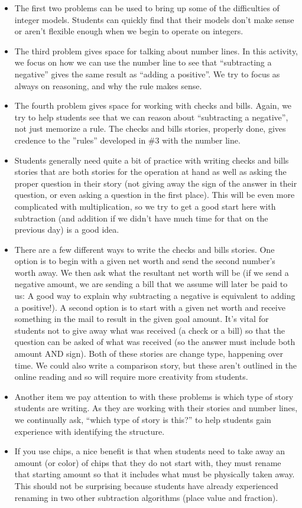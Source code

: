 \documentclass{ximera}
\begin{document}
\begin{instructorNotes}
\begin{itemize}
    \item The first two problems can be used to bring up some of the difficulties of integer models.  Students can quickly find that their models don't make sense or aren't flexible enough when we begin to operate on integers.
    \item The third problem gives space for talking about number lines.  In this activity, we focus on how we can use the number line to see that ``subtracting a negative'' gives the same result as ``adding a positive''.  We try to focus as always on reasoning, and why the rule makes sense.
    \item The fourth problem gives space for working with checks and bills.  Again, we try to help students see that we can reason about ``subtracting a negative'', not just memorize a rule.  The checks and bills stories, properly done, gives credence to the ''rules'' developed in \#3 with the number line. 
    \item Students generally need quite a bit of practice with writing checks and bills stories that are both stories for the operation at hand as well as asking the proper question in their story (not giving away the sign of the answer in their question, or even asking a question in the first place).  This will be even more complicated with multiplication, so we try to get a good start here with subtraction (and addition if we didn't have much time for that on the previous day) is a good idea.
    \item There are a few different ways to write the checks and bills stories. One option is to begin with a given net worth and send the second number's worth away.  We then ask what the resultant net worth will be (if we send a negative amount, we are sending a bill that we assume will later be paid to us:  A good way to explain why subtracting a negative is equivalent to adding a positive!). A second option is to start with a given net worth and receive something in the mail to result in the given goal amount.  It's vital for students not to give away what was received (a check or a bill) so that the question can be asked of what was received (so the answer must include both amount AND sign). Both of these stories are change type, happening over time. We could also write a comparison story, but these aren't outlined in the online reading and so will require more creativity from students.
    \item Another item we pay attention to with these problems is which type of story students are writing.  As they are working with their stories and number lines, we continually ask, ``which type of story is this?'' to help students gain experience with identifying the structure.
    \item  If you use chips, a nice benefit is that when students need to take away an amount (or color) of chips that they do not start with, they must rename that starting amount so that it includes what must be physically taken away.  This should not be surprising because students have already experienced renaming in two other subtraction algorithms (place value and fraction).
\end{itemize}



\end{instructorNotes}
\end{document}
